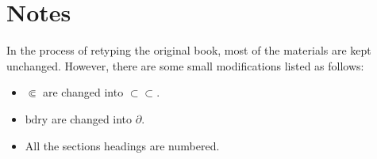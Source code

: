 \chapter*{Notes}

In the process of retyping the original book,
most of the materials are kept unchanged.
However, there are some small modifications listed as follows:

\begin{itemize}
  \item $\Subset$  are changed into $\subset\subset$.
  \item $\text{bdry}$ are changed into $\partial$.
  \item All the sections headings are numbered.
\end{itemize}